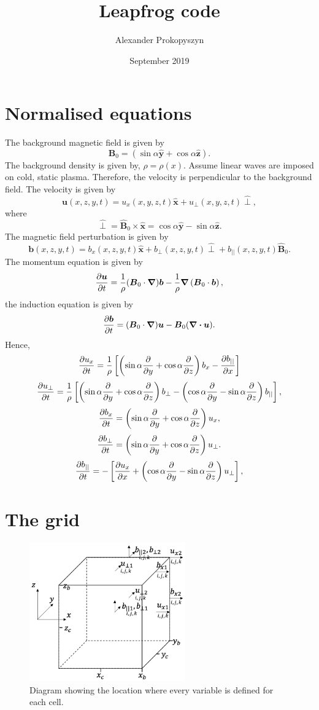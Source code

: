 \documentclass{article}
\title{Leapfrog code}
\author{Alexander Prokopyszyn}
\date{September 2019}
\let\vec\boldsymbol
\begin{document}
\maketitle

\section*{Normalised equations}
The background magnetic field is given by
\[\vec{B}_0=(\sin\alpha\vec{\hat{y}}+\cos\alpha\vec{\hat{z}}).\]
The background density is given by, $\rho=\rho(x)$. Assume linear waves are imposed on cold, static plasma. Therefore, the velocity is perpendicular to the background field.
The velocity is given by
\[\vec{u}(x,z,y,t)=u_x(x,y,z,t)\vec{\hat{x}}+u_{\perp}(x,y,z,t)\vec{\hat{\perp}},\]
where
\[\vec{\hat{\perp}}=\vec{\hat{B}}_0\times\vec{\hat{x}}=\cos\alpha\vec{\hat{y}}-\sin{\alpha}\vec{\hat{z}}.\]
The magnetic field perturbation is given by
\[\vec{b}(x,z,y,t)=b_x(x,z,y,t)\vec{\hat{x}}+b_\perp(x,z,y,t)\vec{\hat{\perp}}+b_{||}(x,z,y,t)\vec{\hat{B}}_0.\]
The momentum equation is given by
\[\pdv{\vec{u}}{t}=\frac{1}{\rho}(\vec{B}_0\cdot\vec{\nabla})\vec{b}-\frac{1}{\rho}\vec{\nabla}\left(\vec{B}_0\cdot\vec{b}\right),\]
the induction equation is given by
\[\pdv{\vec{b}}{t}=(\vec{B}_0\cdot\vec{\nabla})\vec{u}-\vec{B}_0(\div\vec{u}).\]
Hence,
\[\pdv{u_x}{t}=\frac{1}{\rho}\left[\left(\sin\alpha\pdv{}{y}+\cos\alpha\pdv{}{z}\right)b_x - \pdv{b_{||}}{x}\right]\]
\[\pdv{u_\perp}{t}=\frac{1}{\rho}\left[\left(\sin\alpha\pdv{}{y}+\cos\alpha\pdv{}{z}\right)b_\perp-\left(\cos\alpha\pdv{}{y}-\sin\alpha\pdv{}{z}\right)b_{||}\right],\]
\[\pdv{b_x}{t}=\left(\sin\alpha\pdv{}{y}+\cos\alpha\pdv{}{z}\right)u_x,\]
\[\pdv{b_\perp}{t}=\left(\sin\alpha\pdv{}{y}+\cos\alpha\pdv{}{z}\right)u_{\perp}.\]
\[\pdv{b_{||}}{t}=-\left[\pdv{u_x}{x}+\left(\cos\alpha\pdv{}{y}-\sin\alpha\pdv{}{z}\right)u_{\perp}\right],\]

\newpage

\section*{The grid}

\begin{figure}[!htp]
    \centering
    \includegraphics[width=0.6\textwidth]{grid2_.png}
    \caption{Diagram showing the location where every variable is defined for each cell.}
    \label{fig:grid}
\end{figure}
\end{document}
